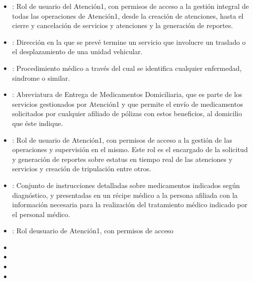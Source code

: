 \documentclass[letterpaper,10pt,spanish]{sphinxmanual}
\begin{document}
\begin{itemize}
\item {} 
: Rol de usuario del Atención\sphinxhyphen{}1, con permisos de acceso a la gestión integral de todas las operaciones de Atención\sphinxhyphen{}1, desde la creación de atenciones, hasta el cierre y cancelación de servicios y atenciones y la generación de reportes.

\item {} 
: Dirección en la que se prevé termine un servicio que involucre un traslado o el desplazamiento de una unidad vehicular.

\item {} 
: Procedimiento médico a través del cual se identifica cualquier enfermedad, sindrome o similar.

\item {} 
: Abreviatura de Entrega de Medicamentos Domiciliaria, que es parte de los servicios gestionados por Atención\sphinxhyphen{}1 y que permite el envío de medicamentos solicitados por cualquier afiliado de pólizas con estos beneficios, al domicilio que éste indique.

\item {} 
: Rol de usuario de Atención\sphinxhyphen{}1, con permisos de acceso a la gestión de las operaciones y supervisión en el mismo. Este rol es el encargado de la solicitud y generación de reportes sobre estatus en tiempo real de las atenciones y servicios y creación de tripulación entre otros.

\item {} 
: Conjunto de instrucciones detalladas sobre medicamentos indicados según diagnóstico, y presentadas en un récipe médico a la persona afiliada con la información necesaria para la realización del tratamiento médico indicado por el personal médico.

\item {} 
: Rol deusuario de Atención\sphinxhyphen{}1, con permisos de acceso

\item {} 

\item {} 

\item {} 

\item {} 


\end{itemize}
\end{document}
